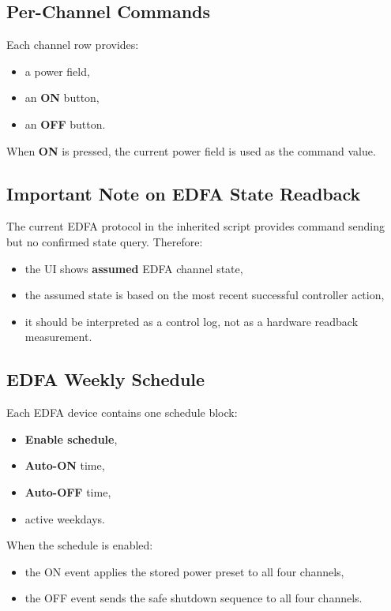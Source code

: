 \documentclass[11pt,a4paper]{article}
\begin{document}
\subsection{Per-Channel Commands}
Each channel row provides:
\begin{itemize}[leftmargin=1.5em]
    \item a power field,
    \item an \textbf{ON} button,
    \item an \textbf{OFF} button.
\end{itemize}

When \textbf{ON} is pressed, the current power field is used as the command value.

\subsection{Important Note on EDFA State Readback}
The current EDFA protocol in the inherited script provides command sending but no confirmed state query. Therefore:
\begin{itemize}[leftmargin=1.5em]
    \item the UI shows \textbf{assumed} EDFA channel state,
    \item the assumed state is based on the most recent successful controller action,
    \item it should be interpreted as a control log, not as a hardware readback measurement.
\end{itemize}

\subsection{EDFA Weekly Schedule}
Each EDFA device contains one schedule block:
\begin{itemize}[leftmargin=1.5em]
    \item \textbf{Enable schedule},
    \item \textbf{Auto-ON} time,
    \item \textbf{Auto-OFF} time,
    \item active weekdays.
\end{itemize}

When the schedule is enabled:
\begin{itemize}[leftmargin=1.5em]
    \item the ON event applies the stored power preset to all four channels,
    \item the OFF event sends the safe shutdown sequence to all four channels.
\end{itemize}
\end{document}
